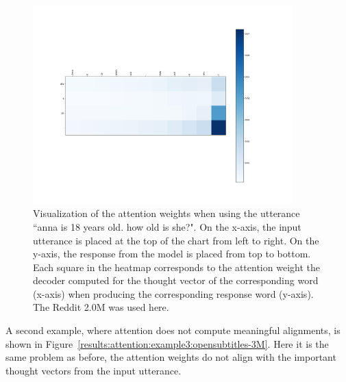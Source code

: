 \begin{figure}[h]
	\centering
	\includegraphics[width=10cm]{img/attention/attention_visualization3_reddit_2m.png}
	\caption{Visualization of the attention weights when using the utterance ``anna is 18 years old. how old is she?". On the x-axis, the input utterance is placed at the top of the chart from left to right. On the y-axis, the response from the model is placed from top to bottom. Each square in the heatmap corresponds to the attention weight the decoder computed for the thought vector of the corresponding word (x-axis) when producing the corresponding response word (y-axis). The Reddit 2.0M was used here.}
	\label{results:attention:example3:reddit}
\end{figure}

A second example, where attention does not compute meaningful alignments, is shown in Figure~\ref{results:attention:example3:opensubtitles-3M}. Here it is the same problem as before, the attention weights do not align with the important thought vectors from the input utterance.


